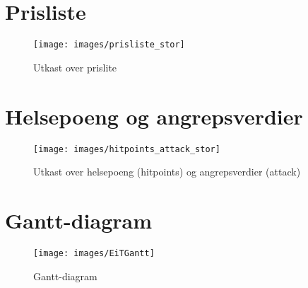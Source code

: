 \appendix {} \pagestyle{plain}
\section{Prisliste} \label{A}

			\begin{figure} [H]
				\begin{center}
				\texttt{[image: images/prisliste\_stor]}
				\caption{Utkast over prislite}
				\end{center}
			\end{figure}

\section{Helsepoeng og angrepsverdier} \label{B}

			\begin{figure} [H]
				\begin{center}
					\texttt{[image: images/hitpoints\_attack\_stor]}
				\end{center}
				\caption{Utkast over helsepoeng (hitpoints) og angrepsverdier (attack)}
			\end{figure}

\section{Gantt-diagram} \label{app:Gantt}
	\begin{figure} [H]
		\begin{center}
		\texttt{[image: images/EiTGantt]}
		\caption{Gantt-diagram}
		\end{center}
	\end{figure}
